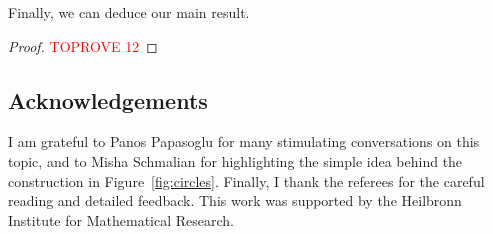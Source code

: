 \documentclass[10pt,a4paper]{amsart}
\theoremstyle{definition}
\begin{document}
Finally, we can deduce our main result. 

\fp*


\begin{proof}\textcolor{red}{TOPROVE 12}\end{proof}


\subsection*{Acknowledgements}

I am grateful to Panos Papasoglu for many stimulating conversations on this topic, and to Misha Schmalian for highlighting the simple idea behind the construction in Figure~\ref{fig:circles}. Finally, I thank the referees for the careful reading and detailed feedback. This work was supported by the Heilbronn Institute for Mathematical Research.






\end{document}
